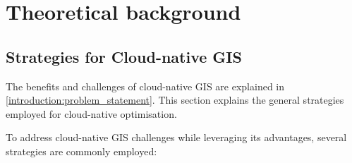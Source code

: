 \chapter{Theoretical background}
\label{ch:theoretical_background}

\section{Strategies for Cloud-native GIS}
\label{tb:strategies_for_cloud_native_gis}

The benefits and challenges of cloud-native GIS are explained in \autoref{introduction:problem_statement}. This section explains the general strategies employed for cloud-native optimisation.

To address cloud-native GIS challenges while leveraging its advantages, several strategies are commonly employed:

